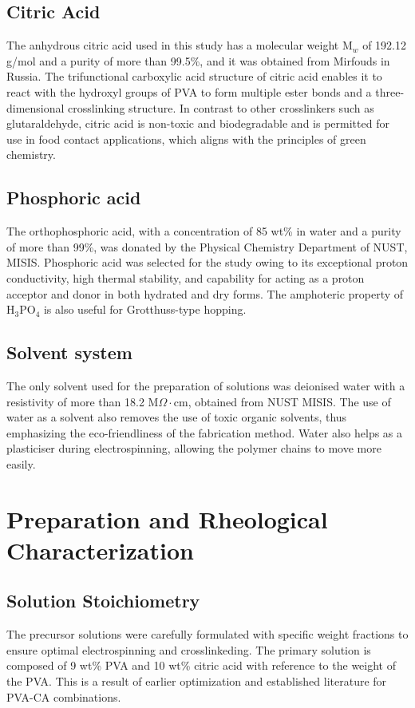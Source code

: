\documentclass[12pt,a4paper]{report}
\begin{document}
\subsection{Citric Acid}
The anhydrous citric acid used in this study has a molecular weight M\(_w\) of 192.12 g/mol and a purity of more than 99.5\%, and it was obtained from Mirfouds in Russia. The trifunctional carboxylic acid structure of citric acid enables it to react with the hydroxyl groups of PVA to form multiple ester bonds and a three-dimensional crosslinking structure.\cite{50,51} In contrast to other crosslinkers such as glutaraldehyde, citric acid is non-toxic and biodegradable and is permitted for use in food contact applications, which aligns with the principles of green chemistry.\cite{48, 53}

\subsection{Phosphoric acid}
The orthophosphoric acid, with a concentration of 85 wt\% in water and a purity of more than 99\%, was donated by the Physical Chemistry Department of NUST, MISIS. Phosphoric acid was selected for the study owing to its exceptional proton conductivity, high thermal stability, and capability for acting as a proton acceptor and donor in both hydrated and dry forms.\cite{55,56} The amphoteric property of H\(_3\)PO\(_4\) is also useful for Grotthuss-type hopping.\cite{21}

\subsection{Solvent system}
The only solvent used for the preparation of solutions was deionised water with a resistivity of more than 18.2 M\(\Omega\cdot\)cm, obtained from NUST MISIS. The use of water as a solvent also removes the use of toxic organic solvents, thus emphasizing the eco-friendliness of the fabrication method.\cite{54} Water also helps as a plasticiser during electrospinning, allowing the polymer chains to move more easily.\cite{46}

\section{Preparation and Rheological Characterization}
\subsection{Solution Stoichiometry}
The precursor solutions were carefully formulated with specific weight fractions to ensure optimal electrospinning and crosslinkeding. The primary solution is composed of 9 wt\% PVA and 10 wt\% citric acid with reference to the weight of the PVA. This is a result of earlier optimization and established literature for PVA-CA combinations. \cite{46,47}
\end{document}
